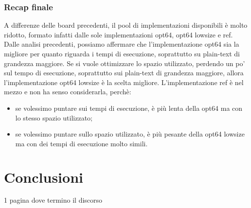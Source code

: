 \documentclass[12pt,a4paper,italian]{report}
\begin{document}
\subsection{Recap finale}

A differenze delle board precedenti, il pool di implementazioni disponibili è molto ridotto, formato infatti dalle sole implementazioni opt64, opt64 lowsize e ref. Dalle analisi precedenti, possiamo affermare che l'implementazione opt64 sia la migliore per quanto riguarda i tempi di esecuzione, soprattutto su plain-text di grandezza maggiore. Se si vuole ottimizzare lo spazio utilizzato, perdendo un po' sul tempo di esecuzione, soprattutto sui plain-text di grandezza maggiore, allora l'implementazione opt64 lowsize è la scelta migliore. L'implementazione ref è nel mezzo e non ha senso considerarla, perchè: \begin{itemize}
    \item se volessimo puntare sui tempi di esecuzione, è più lenta della opt64 ma con lo stesso spazio utilizzato;
    \item se volessimo puntare sullo spazio utilizzato, è più pesante della opt64 lowsize ma con dei tempi di esecuzione molto simili.
\end{itemize}

\newpage

\chapter{Conclusioni}

1 pagina dove termino il discorso

\newpage

\printbibliography
\end{document}
